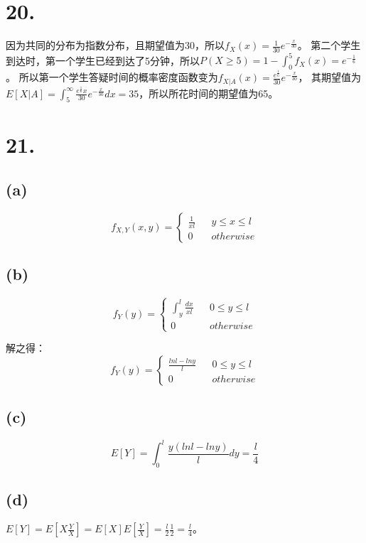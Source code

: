 \documentclass[UTF8]{report}
\begin{document}
    \section*{20.}
        因为共同的分布为指数分布，且期望值为30，所以$f_X(x) = \frac{1}{30}e^{-\frac{x}{30}}$。
        第二个学生到达时，第一个学生已经到达了5分钟，所以$P(X \geq 5) = 1 - \int_{0}^{5}f_X(x) = e^{-\frac{1}{6}}$。
        所以第一个学生答疑时间的概率密度函数变为$f_{X|A}(x) = \frac{e^{\frac{1}{6}}}{30}e^{-\frac{x}{30}}$，
        其期望值为$E[X|A] = \int_{5}^{\infty}\frac{e^{\frac{1}{6}}x}{30}e^{-\frac{x}{30}}dx = 35$，所以所花时间的期望值为65。
    \section*{21.}
        \subsection*{(a)}
            $$f_{X, Y}(x, y) = \left\{
                \begin{array}{lcr}
                    \frac{1}{xl} & & y \leq x \leq l\\
                    0 & & otherwise
                \end{array}
            \right.$$
        \subsection*{(b)}
            $$f_{Y}(y) = \left\{
                \begin{array}{lcr}
                    \int_{y}^{l}\frac{dx}{xl} & & 0 \leq y \leq l\\
                    0 & & otherwise
                \end{array}
            \right.$$
            
            解之得：
            $$f_{Y}(y) = \left\{
                \begin{array}{lcr}
                    \frac{lnl - lny}{l} & & 0 \leq y \leq l\\
                    0 & & otherwise
                \end{array}
            \right.$$
        \subsection*{(c)}
            $$E[Y] = \int_{0}^{l}\frac{y(lnl - lny)}{l}dy = \frac{l}{4}$$
        \subsection*{(d)}
            $E[Y] = E[X\frac{Y}{X}] = E[X]E[\frac{Y}{X}] = \frac{l}{2}\frac{1}{2} = \frac{l}{4}$。
\end{document}
